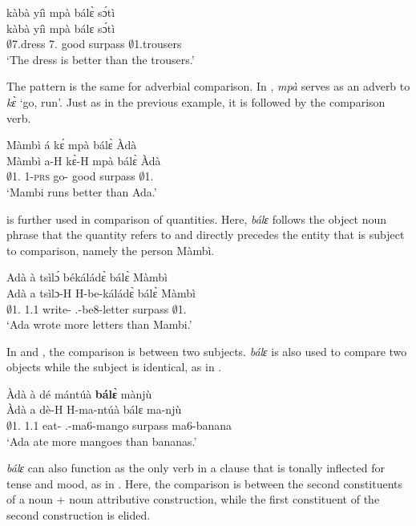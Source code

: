 \ea \label{CC1}
  \glll kàbà yíì mpà bálɛ̀ sɔ́tì \\
        kàbà yíì mpà bálɛ sɔ́tì \\
       $\emptyset$7.dress 7.{\COP} good surpass $\emptyset$1.trousers\\
    \trans `The dress is better than the trousers.'
\z

The pattern is the same for adverbial comparison. In , {\itshape mpà} serves as an adverb to {\itshape kɛ̀} `go, run'. Just as in the previous example, it is followed by the comparison verb.

\ea \label{CC2}
  \glll Màmbì á kɛ́ mpà bálɛ̀ Àdà \\
        Màmbì a-H kɛ̀-H mpà bálɛ̀ Àdà \\
       $\emptyset$1.{\PN} 1-\textsc{prs} go-{\R} good surpass $\emptyset$1.{\PN}  \\
    \trans `Mambi runs better than Ada.'
\z

 is further used in comparison of quantities. Here, {\itshape bálɛ} follows the object noun phrase that the quantity refers to and directly precedes the entity that is subject to comparison, namely the person Màmbì.

\ea \label{CC3}
  \glll Adà à tsìlɔ́ békáládɛ̀ bálɛ̀ Màmbì \\
        Adà a tsìlɔ-H H-be-káládɛ̀ bálɛ̀ Màmbì \\
       $\emptyset$1.{\PN} 1.{\PST}1 write-{\R} {\OBJ}.{\LINK}-be8-letter surpass $\emptyset$1.{\PN}  \\
    \trans `Ada wrote more letters than Mambi.'
\z

In  and , the comparison is between two subjects. {\itshape bálɛ} is also used to compare two objects while the subject is identical, as in .

\ea \label{CC3a}
  \glll Àdà à dé mántúà {\bfseries bálɛ̀} mànjù \\
        Àdà a dè-H H-ma-ntúà bálɛ ma-njù \\
       $\emptyset$1.{\PN} 1.{\PST}1 eat-{\R} {\OBJ}.{\LINK}-ma6-mango surpass ma6-banana\\
    \trans `Ada ate more mangoes than bananas.'
\z

{\itshape bálɛ} can also function as the only verb in a clause that is tonally inflected for tense and mood, as in . Here, the comparison is between the second constituents of a noun + noun attributive construction, while the first constituent of the second construction is elided.

